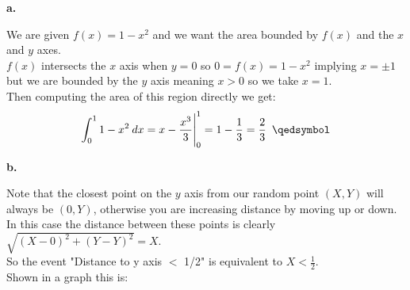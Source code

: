 \documentclass{article}
\begin{document}
{\Large\textbf{a.}}
\begin{center}
\doublespacing
    We are given $f(x) = 1 - x^2$ and we want the area bounded by $f(x)$ and the $x$ and $y$ axes.
    \\$f(x)$ intersects the $x$ axis when $y = 0$ so $0 = f(x) = 1 - x^2$ implying $x =\pm 1$ but we are bounded by the $y$ axis meaning $x > 0$ so we take $x = 1$.
    \\Then computing the area of this region directly we get:
    \[\int _0^1 1 - x^2\: dx = x -\frac{x^3}{3}\Bigg{|}_0^1 = 1 -\frac{1}{3} =\frac{2}{3}\;\:\qedsymbol\]
\end{center}

{\Large\textbf{b.}}
\begin{center}
\doublespacing
    Note that the closest point on the $y$ axis from our random point $(X, Y)$ will always be $(0, Y)$, otherwise you are increasing distance by moving up or down.
    \\In this case the distance between these points is clearly $\sqrt{(X - 0)^2 + (Y - Y)^2} = X$.
    \\So the event "Distance to y axis $<$ 1/2" is equivalent to $X <\frac{1}{2}$.
    \\Shown in a graph this is:
    \break\break
\end{center}
\end{document}
